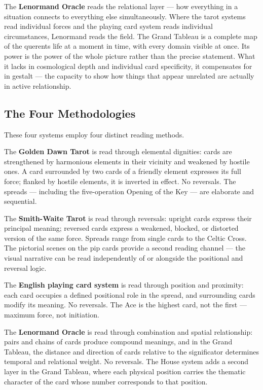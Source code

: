 The \textbf{Lenormand Oracle} reads the relational layer --- how everything in a situation connects to everything else simultaneously. Where the tarot systems read individual forces and the playing card system reads individual circumstances, Lenormand reads the field. The Grand Tableau is a complete map of the querent\textquotesingle s life at a moment in time, with every domain visible at once. Its power is the power of the whole picture rather than the precise statement. What it lacks in cosmological depth and individual card specificity, it compensates for in gestalt --- the capacity to show how things that appear unrelated are actually in active relationship.

\subsection{The Four Methodologies}\label{the-four-methodologies}

These four systems employ four distinct reading methods.

The \textbf{Golden Dawn Tarot} is read through elemental dignities: cards are strengthened by harmonious elements in their vicinity and weakened by hostile ones. A card surrounded by two cards of a friendly element expresses its full force; flanked by hostile elements, it is inverted in effect. No reversals. The spreads --- including the five-operation Opening of the Key --- are elaborate and sequential.

The \textbf{Smith-Waite Tarot} is read through reversals: upright cards express their principal meaning; reversed cards express a weakened, blocked, or distorted version of the same force. Spreads range from single cards to the Celtic Cross. The pictorial scenes on the pip cards provide a second reading channel --- the visual narrative can be read independently of or alongside the positional and reversal logic.

The \textbf{English playing card system} is read through position and proximity: each card occupies a defined positional role in the spread, and surrounding cards modify its meaning. No reversals. The Ace is the highest card, not the first --- maximum force, not initiation.

The \textbf{Lenormand Oracle} is read through combination and spatial relationship: pairs and chains of cards produce compound meanings, and in the Grand Tableau, the distance and direction of cards relative to the significator determines temporal and relational weight. No reversals. The House system adds a second layer in the Grand Tableau, where each physical position carries the thematic character of the card whose number corresponds to that position.

